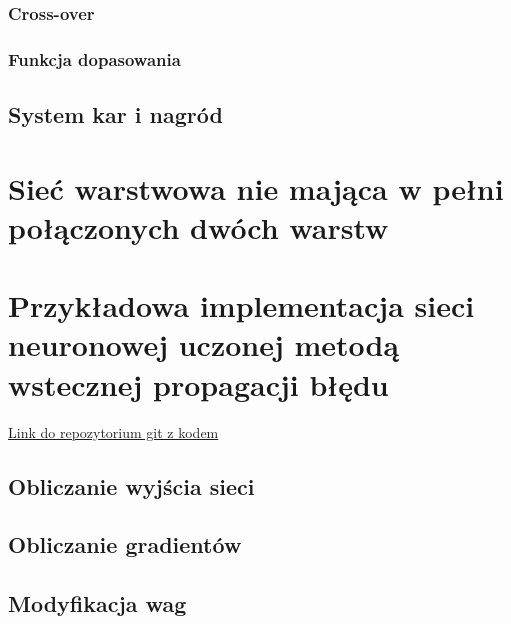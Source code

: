 \documentclass[]{article}
\begin{document}
		\subsubsection{Cross-over}
		\subsubsection{Funkcja dopasowania}
	\subsection{System kar i nagród}

\newpage
\section{Sieć warstwowa nie mająca w pełni połączonych dwóch warstw}

\newpage
\section{Przykładowa implementacja sieci neuronowej uczonej metodą wstecznej propagacji błędu}
	\href{https://github.com/DrwalinPCF/NeuralNetwork}{Link do repozytorium git z kodem}
	\subsection{Obliczanie wyjścia sieci}
	\subsection{Obliczanie gradientów}
	\subsection{Modyfikacja wag}
	
\end{document}
